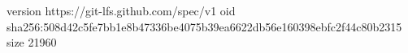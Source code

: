 version https://git-lfs.github.com/spec/v1
oid sha256:508d42c5fe7bb1e8b47336be4075b39ea6622db56e160398ebfc2f44c80b2315
size 21960
